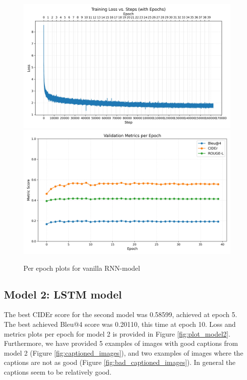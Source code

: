 \begin{figure}[H]
    \centering
    \includegraphics[width=0.8\linewidth]{Figures/model1_loss.jpg}
    \includegraphics[width=0.8\linewidth]{Figures/model1_metrics.jpg}
    \caption{Per epoch plots for vanilla RNN-model}
    \label{fig:plot_model1}
\end{figure}

\subsection*{Model 2: LSTM model}

The best CIDEr score for the second model was 0.58599, achieved at epoch 5.
The best achieved Bleu@4 score was 0.20110, this time at epoch 10.
Loss and metrics plots per epoch for model 2 is provided in Figure \ref{fig:plot_model2}.
Furthermore, we have provided 5 examples of images with good captions from model 2 (Figure \ref{fig:captioned_images}), and two examples of images where the captions are not as good (Figure \ref{fig:bad_captioned_images}).
In general the captions seem to be relatively good.

